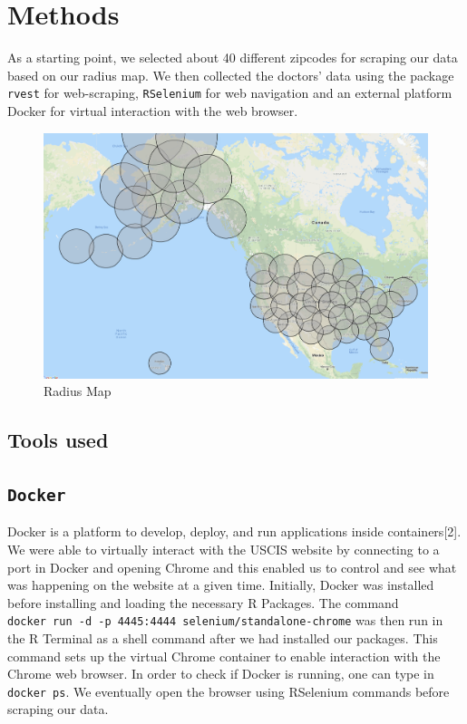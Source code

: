 \documentclass[10pt,letterpaper]{article}
\begin{document}
\section{Methods}\label{methods}

As a starting point, we selected about 40 different zipcodes for
scraping our data based on our radius map. We then collected the
doctors' data using the package \texttt{rvest} for web-scraping,
\texttt{RSelenium} for web navigation and an external platform Docker
for virtual interaction with the web browser.

\begin{figure}
\includegraphics[width=1\linewidth]{RadiusMap} \caption{Radius Map}\label{fig:unnamed-chunk-1}
\end{figure}

\subsection{Tools used}\label{tools-used}

\subsection{\texorpdfstring{\texttt{Docker}}{Docker}}\label{docker}

Docker is a platform to develop, deploy, and run applications inside
containers{[}2{]}. We were able to virtually interact with the USCIS
website by connecting to a port in Docker and opening Chrome and this
enabled us to control and see what was happening on the website at a
given time. Initially, Docker was installed before installing and
loading the necessary R Packages. The command
\texttt{docker\ run\ -d\ -p\ 4445:4444\ selenium/standalone-chrome} was
then run in the R Terminal as a shell command after we had installed our
packages. This command sets up the virtual Chrome container to enable
interaction with the Chrome web browser. In order to check if Docker is
running, one can type in \texttt{docker\ ps}. We eventually open the
browser using RSelenium commands before scraping our data.
\end{document}
